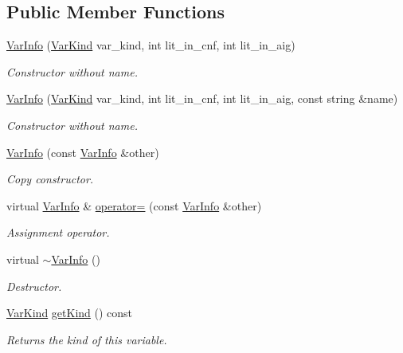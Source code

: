 \subsection*{Public Member Functions}
\begin{DoxyCompactItemize}
\item 
\hyperlink{classVarInfo_ade55c3751f1eeeeedc2b4029fdcd0cb7}{Var\-Info} (\hyperlink{classVarInfo_a64d1da76cf84fe674e5fef9764ef11cf}{Var\-Kind} var\-\_\-kind, int lit\-\_\-in\-\_\-cnf, int lit\-\_\-in\-\_\-aig)
\begin{DoxyCompactList}\small\item\em Constructor without name. \end{DoxyCompactList}\item 
\hyperlink{classVarInfo_a8742276005bed12b1e7a54a7aa8a275e}{Var\-Info} (\hyperlink{classVarInfo_a64d1da76cf84fe674e5fef9764ef11cf}{Var\-Kind} var\-\_\-kind, int lit\-\_\-in\-\_\-cnf, int lit\-\_\-in\-\_\-aig, const string \&name)
\begin{DoxyCompactList}\small\item\em Constructor without name. \end{DoxyCompactList}\item 
\hyperlink{classVarInfo_ad3ef7901d6edf26f384c49112278f941}{Var\-Info} (const \hyperlink{classVarInfo}{Var\-Info} \&other)
\begin{DoxyCompactList}\small\item\em Copy constructor. \end{DoxyCompactList}\item 
virtual \hyperlink{classVarInfo}{Var\-Info} \& \hyperlink{classVarInfo_a63ac268804444dc9579fb5c39af6ce5b}{operator=} (const \hyperlink{classVarInfo}{Var\-Info} \&other)
\begin{DoxyCompactList}\small\item\em Assignment operator. \end{DoxyCompactList}\item 
virtual \hyperlink{classVarInfo_a9d079886fcf428cfcf20edee1d98230f}{$\sim$\-Var\-Info} ()
\begin{DoxyCompactList}\small\item\em Destructor. \end{DoxyCompactList}\item 
\hyperlink{classVarInfo_a64d1da76cf84fe674e5fef9764ef11cf}{Var\-Kind} \hyperlink{classVarInfo_a606fe281152ddf3a9222f04fc2a0b09e}{get\-Kind} () const 
\begin{DoxyCompactList}\small\item\em Returns the kind of this variable. \end{DoxyCompactList}\item 

\end{DoxyCompactItemize}

